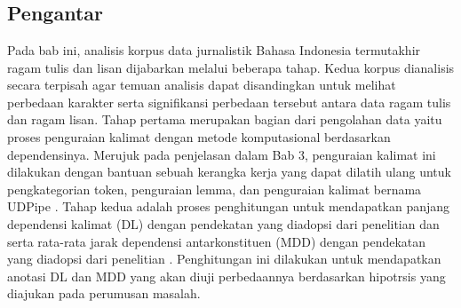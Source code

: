 \chapter{\babEmpat} \label{chap:analisis}

\section{Pengantar}
Pada bab ini, analisis korpus data jurnalistik Bahasa Indonesia termutakhir ragam tulis dan lisan dijabarkan melalui beberapa tahap. Kedua korpus dianalisis secara terpisah agar temuan analisis dapat disandingkan untuk melihat perbedaan karakter serta signifikansi perbedaan tersebut antara data ragam tulis dan ragam lisan. Tahap pertama merupakan bagian dari pengolahan data yaitu proses penguraian kalimat dengan metode komputasional berdasarkan dependensinya. Merujuk pada penjelasan dalam Bab 3, penguraian kalimat ini dilakukan dengan bantuan sebuah kerangka kerja yang dapat dilatih ulang untuk pengkategorian token, penguraian lemma, dan penguraian kalimat bernama UDPipe \citep{udpipe2017}. Tahap kedua adalah proses penghitungan untuk mendapatkan panjang dependensi kalimat (DL) dengan pendekatan yang diadopsi dari penelitian \cite{gildea2010grammars} dan \cite{futrell2015large} serta rata-rata jarak dependensi antarkonstituen (MDD) dengan pendekatan yang diadopsi dari penelitian \cite{liu2017dependency}. Penghitungan ini dilakukan untuk mendapatkan anotasi DL dan MDD yang akan diuji perbedaannya berdasarkan hipotrsis yang diajukan pada perumusan masalah.

